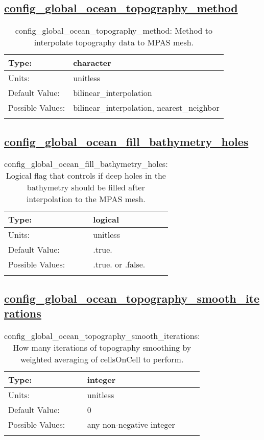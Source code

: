 \subsection[config\_global\_ocean\_topography\_method]{\hyperref[sec:nm_tab_global_ocean]{config\_global\_ocean\_topography\_method}}
\label{subsec:nm_sec_config_global_ocean_topography_method}
\begin{center}
\begin{longtable}{| p{2.0in} || p{4.0in} |}
    \hline
    Type: & character \\
    \hline
    Units: & \si{unitless} \\
    \hline
    Default Value: & bilinear\_interpolation \\
    \hline
    Possible Values: & bilinear\_interpolation, nearest\_neighbor \\
    \hline
    \caption{config\_global\_ocean\_topography\_method: Method to interpolate topography data to MPAS mesh.}
\end{longtable}
\end{center}
\subsection[config\_global\_ocean\_fill\_bathymetry\_holes]{\hyperref[sec:nm_tab_global_ocean]{config\_global\_ocean\_fill\_bathymetry\_holes}}
\label{subsec:nm_sec_config_global_ocean_fill_bathymetry_holes}
\begin{center}
\begin{longtable}{| p{2.0in} || p{4.0in} |}
    \hline
    Type: & logical \\
    \hline
    Units: & \si{unitless} \\
    \hline
    Default Value: & .true. \\
    \hline
    Possible Values: & .true. or .false. \\
    \hline
    \caption{config\_global\_ocean\_fill\_bathymetry\_holes: Logical flag that controls if deep holes in the bathymetry should be filled after interpolation to the MPAS mesh.}
\end{longtable}
\end{center}
\subsection[config\_global\_ocean\_topography\_smooth\_iterations]{\hyperref[sec:nm_tab_global_ocean]{config\_global\_ocean\_topography\_smooth\_iterations}}
\label{subsec:nm_sec_config_global_ocean_topography_smooth_iterations}
\begin{center}
\begin{longtable}{| p{2.0in} || p{4.0in} |}
    \hline
    Type: & integer \\
    \hline
    Units: & \si{unitless} \\
    \hline
    Default Value: & 0 \\
    \hline
    Possible Values: & any non-negative integer \\
    \hline
    \caption{config\_global\_ocean\_topography\_smooth\_iterations: How many iterations of topography smoothing by weighted averaging of cellsOnCell to perform.}
\end{longtable}
\end{center}
